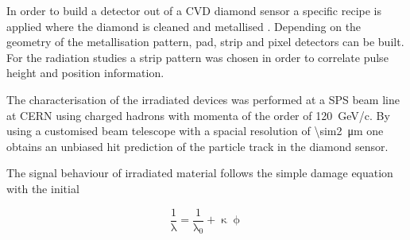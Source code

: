 In order to build a detector out of a \ac{CVD} diamond sensor a specific recipe is applied where the diamond is cleaned and metallised \cite{sussmann}. Depending on the geometry of the metallisation pattern, pad, strip and pixel detectors can be built. For the radiation studies a strip pattern was chosen in order to correlate pulse height and position information.\par
The characterisation of the irradiated devices was performed at a \ac{SPS} beam line at CERN using charged hadrons with momenta of the order of \SI{120}{\giga\electronvolt/c}. By using a customised beam telescope with a spacial resolution of \SI{\sim2}{\micro\meter} one obtains an unbiased hit prediction of the particle track in the diamond sensor.\par
The signal behaviour of irradiated material follows the simple damage equation with the initial 

\begin{equation}
	\frac{1}{\uplambda} = \frac{1}{\uplambda_0} + \upkappa\upphi \label{erad}
\end{equation}

